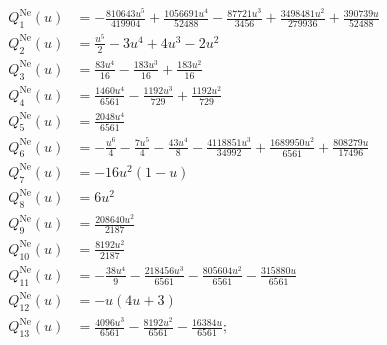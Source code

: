 \begin{subequations}
\begin{align}
Q_1^{\text{Ne}}(u) &=  -\frac{810643 u^5}{419904}+\frac{1056691 u^4}{52488}-\frac{87721 u^3}{3456}+\frac{3498481 u^2}{279936}+\frac{390739 u}{52488}\\
Q_2^{\text{Ne}}(u)  &=  \frac{u^5}{2}-3 u^4+4 u^3-2 u^2\\
Q_3^{\text{Ne}}(u)  &=  \frac{83 u^4}{16}-\frac{183 u^3}{16}+\frac{183 u^2}{16}\\
Q_4^{\text{Ne}}(u)  &=  \frac{1460 u^4}{6561}-\frac{1192 u^3}{729}+\frac{1192 u^2}{729}\\
Q_5^{\text{Ne}}(u)  &=  \frac{2048 u^4}{6561}\\
Q_6^{\text{Ne}}(u)  &=  -\frac{u^6}{4}-\frac{7 u^5}{4}-\frac{43 u^4}{8}-\frac{4118851 u^3}{34992}+\frac{1689950 u^2}{6561}+\frac{808279 u}{17496}\\
Q_7^{\text{Ne}}(u)  &=  -16u^2(1-u)\\
Q_8^{\text{Ne}}(u)  &=  6u^2\\
Q_9^{\text{Ne}}(u)  &=  \frac{208640 u^2}{2187}\\
Q_{10}^{\text{Ne}}(u)  &=  \frac{8192 u^2}{2187}\\
Q_{11}^{\text{Ne}}(u)  &=  -\frac{38 u^4}{9}-\frac{218456 u^3}{6561}-\frac{805604 u^2}{6561}-\frac{315880 u}{6561}\\
Q_{12}^{\text{Ne}}(u)  &=  -u(4u+3)\\
Q_{13}^{\text{Ne}}(u)  &=  \frac{4096 u^3}{6561}-\frac{8192 u^2}{6561}-\frac{16384 u}{6561};
\end{align}
\end{subequations}